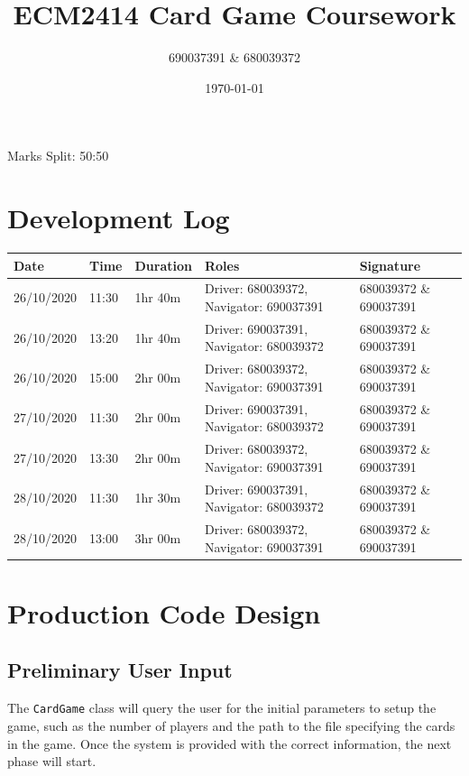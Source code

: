 \documentclass[a4paper, 11pt] {article}
\begin{document}
\title{ECM2414 Card Game Coursework}
\author{690037391 \& 680039372}
\date{\today}
\maketitle
	\begin{center}
		Marks Split: 50:50
	\end{center}
\pagebreak
\section*{Development Log}
\begin{center}
\begin{table}[H]
\begin{tabular}{|l|l|l|l|l|}
\hline
Date           & Time     & Duration  & Roles                                                 & Signature                       \\ \hline
 26/10/2020 & 11:30    & 1hr 40m  & Driver: 680039372, Navigator: 690037391 & 680039372 \& 690037391 \\ \hline
 26/10/2020 & 13:20    & 1hr 40m  & Driver: 690037391, Navigator: 680039372 & 680039372 \& 690037391 \\ \hline
 26/10/2020 & 15:00    & 2hr 00m & Driver: 680039372, Navigator: 690037391 & 680039372 \& 690037391 \\ \hline
 27/10/2020 & 11:30    & 2hr 00m & Driver: 690037391, Navigator: 680039372 & 680039372 \& 690037391 \\ \hline
 27/10/2020 & 13:30 & 2hr 00m & Driver: 680039372, Navigator: 690037391 & 680039372 \& 690037391 \\ \hline
 28/10/2020 & 11:30 & 1hr 30m & Driver: 690037391, Navigator: 680039372 & 680039372 \& 690037391 \\ \hline
 28/10/2020 & 13:00 & 3hr 00m & Driver: 680039372, Navigator: 690037391 & 680039372 \& 690037391 \\ \hline
\end{tabular}
\end{table}
\end{center}
\FloatBarrier
\pagebreak
\section*{Production Code Design}
\subsection*{Preliminary User Input}
The \texttt{CardGame} class will query the user for the initial parameters to setup the game, such as the number of players and the path to the file specifying the cards in the game. Once the system is provided with the correct information, the next phase will start.
\end{document}
